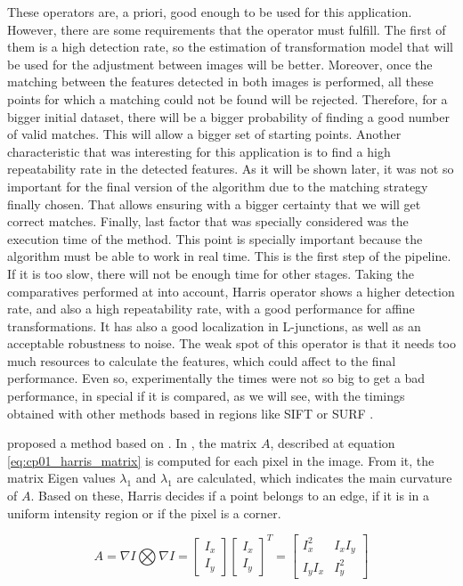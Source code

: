 These operators are, a priori, good enough to be used for this application. However, there are some requirements that the operator must fulfill. The first of them is a high detection rate, so the estimation of transformation model that will be used for the adjustment between images will be better. Moreover, once the matching between the features detected in both images is performed, all these points for which a matching could not be found will be rejected. Therefore, for a bigger initial dataset, there will be a bigger probability of finding a good number of valid matches. This will allow a bigger set of starting points. Another characteristic that was interesting for this application is to find a high repeatability rate in the detected features. As it will be shown later, it was not so important for the final version of the algorithm due to the matching strategy finally chosen. That allows ensuring with a bigger certainty that we will get correct matches. Finally, last factor that was specially considered was the execution time of the method. This point is specially important because the algorithm must be able to work in real time. This is the first step of the pipeline. If it is too slow, there will not be enough time for other stages. Taking the comparatives performed at \cite{mohanna2001performance, zheng1999analysis} into account, Harris operator shows a higher detection rate, and also a high repeatability rate, with a good performance for affine transformations. It has also a good localization in L-junctions, as well as an acceptable robustness to noise. The weak spot of this operator is that it needs too much resources to calculate the features, which could affect to the final performance. Even so, experimentally the times were not so big to get a bad performance, in special if it is compared, as we will see, with the timings obtained with other methods based in regions like SIFT \citep{lowe1999object} or SURF \citep{bay2008speeded}.

\cite{shi1994good} proposed a method based on \cite{harris1988combined}. In \cite{harris1988combined}, the matrix $A$, described at equation \ref{eq:cp01_harris_matrix} is computed for each pixel in the image. From it, the matrix Eigen values $\lambda_1$ and $\lambda_1$ are calculated, which indicates the main curvature of $A$. Based on these, Harris decides if a point belongs to an edge, if it is in a uniform intensity region or if the pixel is a corner.

\begin{equation}\label{eq:cp01_harris_matrix}
A = \nabla I \bigotimes \nabla I = 
\left [ \begin{array}{c} I_x \\ I_y \end{array} \right ]
\left [ \begin{array}{c} I_x \\ I_y \end{array} \right ]^T = 
\left [ \begin{array}{cc} 
I_x^2 & I_xI_y \\ 
I_yI_x & I_y^2
\end{array} \right ]
\end{equation}

